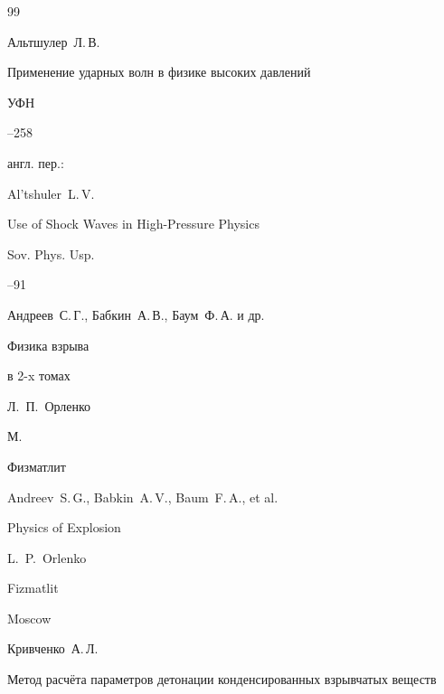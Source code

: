 \begin{thebibliography}{99}




\by Альтшулер~Л.\,В.

\paper Применение ударных волн в физике высоких давлений

\jour УФН




--258

\transl англ. пер.:~

\by Al'tshuler~L.\,V.

\paper Use of Shock Waves in High-Pressure Physics


\jour Sov. Phys. Usp.



--91





\by Андреев~С.\,Г.,  Бабкин~А.\,В., Баум~Ф.\,А. и др.

\book Физика взрыва

\bookinfo в 2-x томах

\ed Л.~П.~Орленко


\publaddr М.

\publ Физматлит



\misctransl

\by Andreev~S.\,G., Babkin~A.\,V., Baum~F.\,A., et al.

\book Physics of Explosion

\ed L.~P.~Orlenko 


\publ Fizmatlit

\publaddr Moscow






\by Кривченко~А.\,Л.

\paper Метод расчёта параметров детонации конденсированных взрывчатых веществ


\end{thebibliography}
